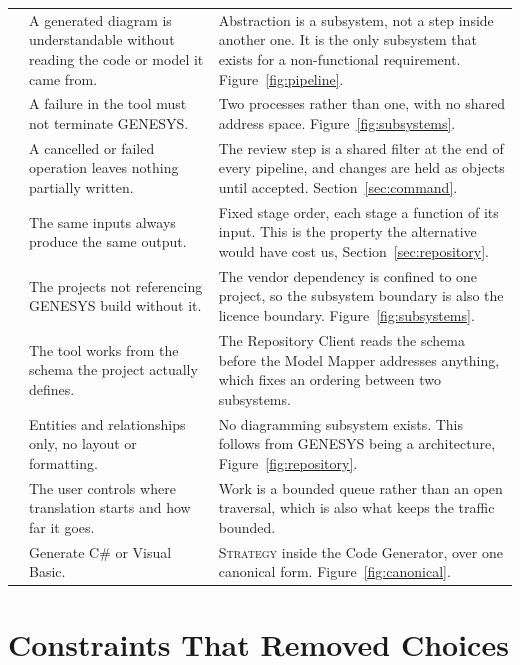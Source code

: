 \begin{longtable}{L{0.13\textwidth}L{0.37\textwidth}L{0.42\textwidth}}
	 & A generated diagram is understandable without reading the
	code or model it came from. & Abstraction is a subsystem, not a step
	inside another one. It is the only subsystem that exists for a
	non-functional requirement. Figure~\ref{fig:pipeline}. \\
	\addlinespace
	 & A failure in the tool must not terminate GENESYS. & Two
	processes rather than one, with no shared address space.
	Figure~\ref{fig:subsystems}. \\
	\addlinespace
	 & A cancelled or failed operation leaves nothing partially
	written. & The review step is a shared filter at the end of every
	pipeline, and changes are held as objects until accepted.
	Section~\ref{sec:command}. \\
	\addlinespace
	 & The same inputs always produce the same output. & Fixed
	stage order, each stage a function of its input. This is the property the
	 alternative would have cost us,
	Section~\ref{sec:repository}. \\
	\addlinespace
	 & The projects not referencing GENESYS build without it. &
	The vendor dependency is confined to one project, so the subsystem
	boundary is also the licence boundary. Figure~\ref{fig:subsystems}. \\
	\addlinespace
	 & The tool works from the schema the project actually defines.
	& The Repository Client reads the schema before the Model Mapper
	addresses anything, which fixes an ordering between two subsystems. \\
	\addlinespace
	 & Entities and relationships only, no layout or formatting. &
	No diagramming subsystem exists. This follows from GENESYS being a
	 architecture, Figure~\ref{fig:repository}. \\
	\addlinespace
	 & The user controls where translation starts and how far it
	goes. & Work is a bounded queue rather than an open traversal, which is
	also what keeps the  traffic bounded. \\
	\addlinespace
	 & Generate C\# or Visual Basic. & \textsc{Strategy} inside the
	Code Generator, over one canonical form.
	Figure~\ref{fig:canonical}. \\
	\bottomrule
\end{longtable}

\section{Constraints That Removed Choices}


